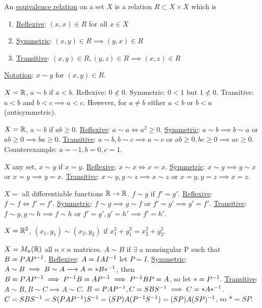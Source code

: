 \documentclass[]{article}
\begin{document}
\begin{definition}
	An \ul{equivalence relation} on a set $X$ is a relation $R\subset X\times X$ which is
	\begin{enumerate}
		\item \ul{Reflexive}: $(x,x)\in R$ for all $x\in X$
		\item \ul{Symmetric}: $(x,y)\in R \implies (y,x)\in R$
		\item \ul{Transitive}: $(x,y)\in R,(y,z)\in R\implies (x,z)\in R$
	\end{enumerate}
	\ul{Notation}: $x\sim y$ for $(x,y)\in R$.
\end{definition}
\begin{example}
	$X=\mathbb{R}$, $a\sim b$ if $a<b$. Reflexive: $0\nless 0$. Symmetric: $0<1$ but $1\nless 0$. Transitive: $a<b$ and $b<c\implies a<c$. However, for $a\neq b$ either $a<b$ or $b<a$ (antisymmetric).
\end{example}
\begin{example}
	$X = \mathbb{R}$, $a\sim b$ if $ab\geq 0$. \ul{Reflexive}: $a\sim a \Leftrightarrow a^2 \geq0$. \ul{Symmetric}: $a\sim b \implies b\sim a$ or $ab\geq 0\implies ba\geq 0$. \ul{Transitive}: $a\sim b,b\sim c\implies a\sim c$ or $ab\geq 0,bc\geq 0 \implies ac\geq 0$. Counterexample: $a=-1,b=0,c=1$.
\end{example}
\begin{example}
	$X$ any set, $x\sim y$ if $x=y$. \ul{Reflexive}: $x\sim x \Leftrightarrow x=x$. \ul{Symmetric}: $x\sim y\implies y\sim x$ or $x=y\implies y=x$. \ul{Transitive}: $x\sim y,y\sim z\implies x\sim z$ or $x=y,y=z\implies x=z$.
\end{example}
\begin{example}
	$X = $ all differentiable functions $\mathbb{R}\rightarrow\mathbb{R}$. $f\sim g$ if $f' = g'$. \ul{Reflexive}: $f\sim f \Leftrightarrow f' = f'$. \ul{Symmetric}: $f\sim g \implies g\sim f$ or $f' = g' \implies g' = f'$. \ul{Transitive}: $f\sim g,g\sim h\implies f\sim h$ or $f' = g',g'=h'\implies f'=h'$.
\end{example}
\begin{example}
	$X = \mathbb{R}^2$, $(x_1,y_1)\sim (x_2,y_2)$ if $x_1^2 + y_1^2 = x_2^2 + y_2^2$.
\end{example}
\begin{example}
	$X = M_n(\mathbb{R})$ all $n\times n$ matrices. $A\sim B$ if $\exists$ a nonsingular P such that $B = PAP^{-1}$. \ul{Reflexive}: $A = IAI^{-1}$ let $P = I$. \ul{Symmetric}: $A\sim B \implies B\sim A \longrightarrow A = *B*^{-1}$, then $B = PAP^{-1} \implies P^{-1} B = AP^{-1} \implies P^{-1} BP = A$, so let $* = P^{-1}$. \ul{Transitive}: $A\sim B,B\sim C\implies A\sim C$. $B = PAP^{-1}, C = SBS^{-1} \implies C = *A*^{-1}$. $C = SBS^{-1} = S(PAP^{-1})S^{-1} = (SP)A(P^{-1} S^{-1}) = (SP)A(SP)^{-1}$, so $*= SP$.
\end{example}
\end{document}

